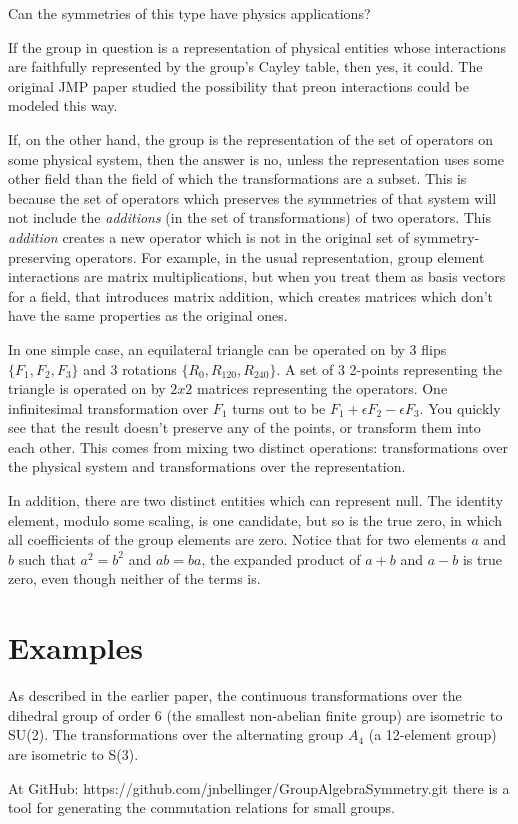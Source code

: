 \documentclass{revtex4-1}
\begin{document}
Can the symmetries of this type have physics applications?

\par If the group in question is a representation of physical
entities whose interactions are faithfully represented by the
group's Cayley table, then yes, it could.  The original JMP
paper studied the possibility that preon interactions could be
modeled this way.

\par  If, on the other hand, the group is the representation of the
set of operators
on some physical system, then the answer is no, unless the
representation uses some other field than the field of which
the transformations are a subset.  This is because
the set of operators which preserves the symmetries of that
system will not include the {\it additions} (in the set of transformations) 
of two operators.  This {\it addition} 
creates a new operator which is not in the original set of 
symmetry-preserving operators.  For example, in the usual
representation, group element interactions are matrix multiplications,
but when you treat them as basis vectors for a field, that introduces matrix
addition, which creates matrices which don't have the same 
properties as the original ones.

\par In one simple case, an equilateral
triangle can be operated on by 3 flips $\{ F_1, F_2, F_3 \}$
and 3 rotations $\{ R_0, R_{120}, R_{240} \}$.  A set of 3 2-points
representing the triangle is operated on by $2x2$ matrices
representing the operators.  One infinitesimal transformation over
$F_1$ turns out to be $F_1 + \epsilon F_2 - \epsilon F_3$.  You
quickly see that the result doesn't preserve any of the points, or
transform them into each other.  This comes from mixing two
distinct operations:  transformations over the physical system and
transformations over the representation.

\par In addition, there are two distinct entities which can represent
null.  The identity element, modulo some scaling, is one candidate,
but so is the true zero, in which all coefficients of the group elements
are zero.  Notice that for two elements $a$ and $b$ such that $a^2=b^2$
and $ab=ba$, the expanded product of $a+b$ and $a-b$ is true zero,
even though neither of the terms is.

\section{ Examples}
As described in the earlier paper, the continuous transformations over
the dihedral group of order 6 (the smallest non-abelian finite group) are
isometric to SU(2).  The transformations over the alternating group $A_4$
(a 12-element group) are isometric to S(3).  

\par At GitHub:  https://github.com/jnbellinger/GroupAlgebraSymmetry.git there
is a tool for generating the commutation relations for small groups.
\end{document}
